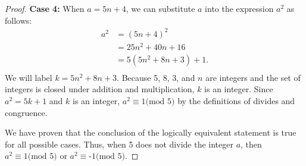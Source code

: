 \documentclass[11 pt]{article}
\newcommand{\newpar}{\vspace{.15in}\noindent}
\begin{document}
\begin{proof}
\newpar
\textbf{Case 4:} When $a=5n+4$, we can substitute $a$ into the expression $a^2$ as follows:
\begin{align*}
a^2&=(5n+4)^2 \\
&= 25n^2+40n+16 \\
&= 5(5n^2+8n+3)+1. \\
\end{align*}
\noindent
We will label $k=5n^2+8n+3$. Because 5, 8, 3, and $n$ are integers and the set of integers is closed under addition and multiplication, $k$ is an integer. Since $a^2=5k+1$ and $k$ is an integer, $a^2\equiv \mbox{1(mod 5)}$ by the definitions of divides and congruence. 

\newpar
We have proven that the conclusion of the logically equivalent statement is true for all possible cases. Thus, when 5 does not divide the integer $a$, then $a^2\equiv \mbox{1(mod 5)}$ or $a^2\equiv \mbox{-1(mod 5)}$.
\end{proof}
\end{document}
